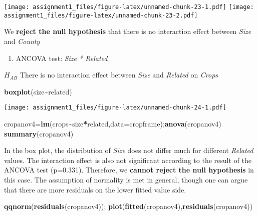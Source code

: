 \documentclass[
]{article}
\newenvironment{Shaded}{\begin{snugshade}}{\end{snugshade}}
\newcommand{\AttributeTok}[1]{\textcolor[rgb]{0.13,0.29,0.53}{#1}}
\newcommand{\FunctionTok}[1]{\textcolor[rgb]{0.13,0.29,0.53}{\textbf{#1}}}
\newcommand{\NormalTok}[1]{#1}
\newcommand{\OtherTok}[1]{\textcolor[rgb]{0.56,0.35,0.01}{#1}}
\newcommand{\SpecialCharTok}[1]{\textcolor[rgb]{0.81,0.36,0.00}{\textbf{#1}}}
\providecommand{\tightlist}{%
  \setlength{\itemsep}{0pt}\setlength{\parskip}{0pt}}
\begin{document}
\texttt{[image: assignment1\_files/figure-latex/unnamed-chunk-23-1.pdf]}
\texttt{[image: assignment1\_files/figure-latex/unnamed-chunk-23-2.pdf]}

We \textbf{reject the null hypothesis} that there is no interaction
effect between \emph{Size} and \emph{County}

\begin{enumerate}
\def\labelenumi{\arabic{enumi}.}
\setcounter{enumi}{1}
\tightlist
\item
  ANCOVA test: \emph{Size * Related}
\end{enumerate}

\(H_{AB}\) There is no interaction effect between \emph{Size} and
\emph{Related} on \emph{Crops}

\begin{Shaded}
\begin{Highlighting}[]
\FunctionTok{boxplot}\NormalTok{(size}\SpecialCharTok{\textasciitilde{}}\NormalTok{related)}
\end{Highlighting}
\end{Shaded}

\texttt{[image: assignment1\_files/figure-latex/unnamed-chunk-24-1.pdf]}

\begin{Shaded}
\begin{Highlighting}[]
\NormalTok{cropanov4}\OtherTok{=}\FunctionTok{lm}\NormalTok{(crops}\SpecialCharTok{\textasciitilde{}}\NormalTok{size}\SpecialCharTok{*}\NormalTok{related,}\AttributeTok{data=}\NormalTok{cropframe);}\FunctionTok{anova}\NormalTok{(cropanov4)}
\FunctionTok{summary}\NormalTok{(cropanov4)}
\end{Highlighting}
\end{Shaded}

In the box plot, the distribution of \emph{Size} does not differ much
for different \emph{Related} values. The interaction effect is also not
significant according to the result of the ANCOVA test (p=0.331).
Therefore, we \textbf{cannot reject the null hypothesis} in this case.
The assumption of normality is met in general, though one can argue that
there are more residuals on the lower fitted value side.

\begin{Shaded}
\begin{Highlighting}[]
\FunctionTok{qqnorm}\NormalTok{(}\FunctionTok{residuals}\NormalTok{(cropanov4)); }\FunctionTok{plot}\NormalTok{(}\FunctionTok{fitted}\NormalTok{(cropanov4),}\FunctionTok{residuals}\NormalTok{(cropanov4))}
\end{Highlighting}
\end{Shaded}
\end{document}
